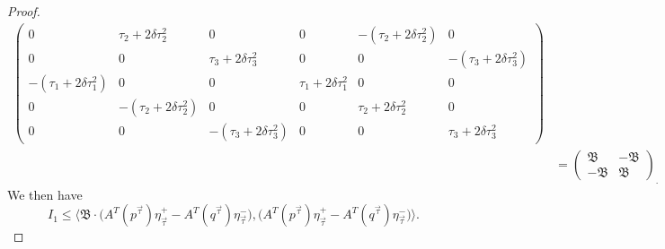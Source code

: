 \documentclass[reqno]{amsart}
\begin{document}
\begin{proof}
\begin{align*}
\begin{pmatrix}
0 & \tau_2+2\delta\tau_2^2 &0&0&-(\tau_2+2\delta\tau_2^2)&0\\
0&0&\tau_3+2\delta\tau_3^2&0&0&-(\tau_3+2\delta\tau_3^2)\\
-( \tau_1+2\delta\tau_1^2) & 0 & 0&\tau_1+2\delta\tau_1^2&0&0\\  
0 & -(\tau_2+2\delta\tau_2^2) &0&0&\tau_2+2\delta\tau_2^2&0\\
0&0&-(\tau_3+2\delta\tau_3^2)&0&0&\tau_3+2\delta\tau_3^2
\end{pmatrix}\\
&=\begin{pmatrix}\mathfrak{B}&-\mathfrak{B}\\-\mathfrak{B}&\mathfrak{B}\end{pmatrix}_.
\end{align*}
We then have 
\begin{equation}\label{I1est}
I_1 \le \Big\langle \mathfrak{B} \cdot \bigg(A^T(p^{\vec{\tau}})\eta^+_{\vec{\tau}} - A^T(q^{\vec{\tau}})\eta^-_{\vec{\tau}}\bigg), \bigg(A^T(p^{\vec{\tau}})\eta^+_{\vec{\tau}} - A^T(q^{\vec{\tau}})\eta^-_{\vec{\tau}}\bigg)\Big\rangle.
\end{equation}


\end{proof}
\end{document}
